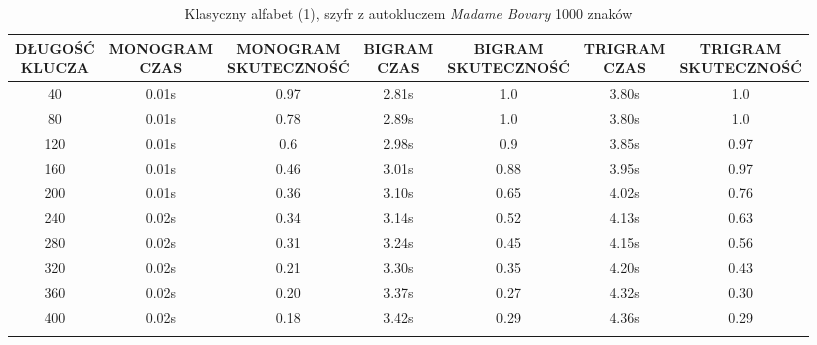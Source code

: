 \documentclass[a4paper]{article}
\theoremstyle{defn}
\theoremstyle{theorem}
\theoremstyle{lemma}
\theoremstyle{cor}
\theoremstyle{fact}
\begin{document}
\begin{center}\begin{small}\begin{longtable}{|c|c|c|c|c|c|c|} 
\hline \makecell{DŁUGOŚĆ\\KLUCZA} &  \makecell{MONOGRAM\\CZAS} & \makecell{MONOGRAM\\SKUTECZNOŚĆ} & \makecell{BIGRAM\\CZAS} &  \makecell{BIGRAM\\SKUTECZNOŚĆ} & \makecell{TRIGRAM\\CZAS} & \makecell{TRIGRAM\\SKUTECZNOŚĆ}\\ \hline 
40 & 0.01s & 0.97 & 2.81s & 1.0 & 3.80s & 1.0 \\ \hline 
80 & 0.01s & 0.78 & 2.89s & 1.0 & 3.80s & 1.0 \\ \hline 
120 & 0.01s & 0.6 & 2.98s & 0.9 & 3.85s & 0.97 \\ \hline 
160 & 0.01s & 0.46 & 3.01s & 0.88 & 3.95s & 0.97 \\ \hline 
200 & 0.01s & 0.36 & 3.10s & 0.65 & 4.02s & 0.76 \\ \hline 
240 & 0.02s & 0.34 & 3.14s & 0.52 & 4.13s & 0.63 \\ \hline 
280 & 0.02s & 0.31 & 3.24s & 0.45 & 4.15s & 0.56 \\ \hline 
320 & 0.02s & 0.21 & 3.30s & 0.35 & 4.20s & 0.43 \\ \hline 
360 & 0.02s & 0.20 & 3.37s & 0.27 & 4.32s & 0.30 \\ \hline 
400 & 0.02s & 0.18 & 3.42s & 0.29 & 4.36s & 0.29 \\ \hline 
\caption{Klasyczny alfabet (1), szyfr z autokluczem \textit{Madame Bovary} 1000 znaków}
\end{longtable}\end{small}\end{center} 
\end{document}
